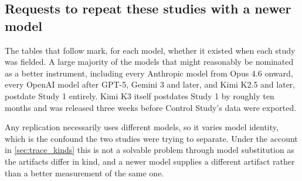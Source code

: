 \documentclass[manuscript,review,anonymous]{acmart}
\begin{document}
\subsection{Requests to repeat these studies with a newer model}

The tables that follow mark, for each model, whether it existed when each study
was fielded. A large majority of the models that might reasonably be
nominated as a better instrument, including every Anthropic model from Opus 4.6
onward, every OpenAI model after GPT-5, Gemini 3 and later, and Kimi K2.5 and
later, postdate Study 1 entirely. Kimi K3 itself postdates Study 1 by roughly
ten months and was released three weeks before Control Study's data were exported.

Any replication necessarily uses different models, so it varies model identity, which is the confound the two studies were trying to separate. Under the account in \autoref{sec:trace_kinds} this
is not a solvable problem through model substitution as the artifacts differ in kind, and a newer model supplies a different artifact rather than a better
measurement of the same one. 
\end{document}
